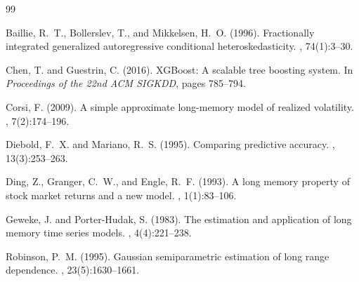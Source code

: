 \documentclass[12pt,a4paper]{article}
\begin{document}
\begin{thebibliography}{99}

Baillie, R.~T., Bollerslev, T., and Mikkelsen, H.~O. (1996).
\newblock Fractionally integrated generalized autoregressive conditional heteroskedasticity.
, 74(1):3--30.

Chen, T. and Guestrin, C. (2016).
\newblock XGBoost: A scalable tree boosting system.
\newblock In {\em Proceedings of the 22nd ACM SIGKDD}, pages 785--794.

Corsi, F. (2009).
\newblock A simple approximate long-memory model of realized volatility.
, 7(2):174--196.

Diebold, F.~X. and Mariano, R.~S. (1995).
\newblock Comparing predictive accuracy.
, 13(3):253--263.

Ding, Z., Granger, C.~W., and Engle, R.~F. (1993).
\newblock A long memory property of stock market returns and a new model.
, 1(1):83--106.

Geweke, J. and Porter-Hudak, S. (1983).
\newblock The estimation and application of long memory time series models.
, 4(4):221--238.

Robinson, P.~M. (1995).
\newblock Gaussian semiparametric estimation of long range dependence.
, 23(5):1630--1661.

\end{thebibliography}
\end{document}
